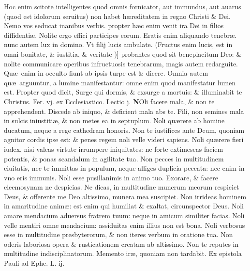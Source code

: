 \documentclass[a5paper,10pt]{book}
\def\rightmarginnote{%
	\lrmarginnote{\hskip\columnwidth \hskip -1em}}
\def\ae{æ}
\begin{document}
\begin{multicols*}{2}
Hoc enim scitote intelligentes quod omnis fornicator, aut immundus, aut auarus (quod est idolorum seruitus) non habet h\ae reditatem in regno Christi \& Dei.
Nemo vos seducat inanibus verbis. propter h\ae c enim venit ira Dei in filios diffidenti\ae . Nolite ergo effici participes eorum.
Eratis enim aliquando tenebr\ae . nunc autem lux in domino. Vt filij lucis ambulate. (Fructus enim lucis, est in omni bonitate, \& iustitia, \& veritate\rightmarginnote{B})] probantes quod sit beneplacitum Deo: \& nolite communicare operibus infructuosis tenebrarum, magis autem redarguite.
Qu\ae \ enim in occulto fiunt ab ipsis turpe est \& dicere. Omnia autem qu\ae \ arguuntur, a lumine manifestantur: omne enim quod manifestatur lumen est.
Propter quod dicit, Surge
qui dormis, \& exsurge a mortuis: \& illuminabit te Christus.
\newline {} \color{red} \hypertarget{FRI-SECVNDA-VAGAN}{Fer. vj.} ex Ecclesiastico. Lectio j. \color{black}
\vspace{-1.25em}
\lettrine[lines=2]{\bfseries N}{}Oli\rightmarginnote{ca. 7.} facere mala, \& non te apprehendent. Discede ab iniquo, \& deficient mala abs te.
Fili, non semines mala in sulcis iniustiti\ae , \& non metes ea in septuplum. Noli qu\ae rere ab homine ducatum, neque a rege cathedram honoris.
Non te iustifices ante Deum, quoniam agnitor cordis ipse est: \& penes regem noli velle videri sapiens.
Noli qu\ae rere fieri iudex, nisi valeas virtute irrumpere iniquitates: ne forte extimescas faciem potentis, \& ponas scandalum in agilitate tua.
Non pecces in multitudinem ciuitatis, nec te immittas in populum, neque alliges duplicia peccata: nec enim in vno eris immunis.
Noli esse pusillanimis in animo tuo. Exorare, \& facere eleemosynam ne despicias.
Ne dicas, in multitudine munerum meorum respiciet Deus, \& offerente me Deo altissimo, munera mea suscipiet.
Non irrideas hominem in amaritudine anim\ae : est enim qui humiliat \& exaltat, circunspector Deus.
Noli amare mendacium aduersus fratrem tuum: neque in amicum similiter facias. Noli velle mentiri omne mendacium: assiduitas enim illius non est bona.
Noli verbosus esse in multitudine presbyterorum, \& non iteres verbum in oratione tua.
Non oderis laboriosa opera \& rusticationem creatam ab altissimo. Non te reputes in multitudine indisciplinatorum. Memento ir\ae , quoniam non tardabit.
\newline {} \color{red} Ex epistola Pauli ad Ephe. \hfill L. ij. \color{black}
\vspace{-1.25em}

\end{multicols*}
\end{document}
